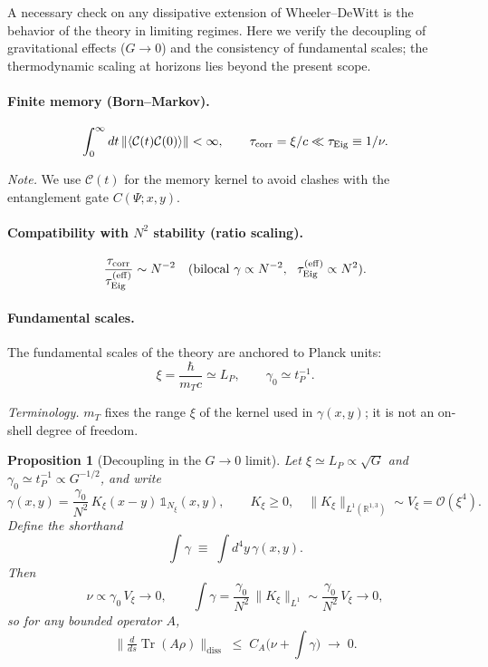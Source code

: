 \documentclass[12pt,a4paper]{article}
\newtheorem{proposition}{Proposition}[section]
\renewcommand{\Tr}{\operatorname{Tr}}
\numberwithin{equation}{section}
\begin{document}
\vspace{0.3cm}
A necessary check on any dissipative extension of Wheeler--DeWitt is the behavior of the theory in limiting regimes. Here we verify the decoupling of gravitational effects ($G\to 0$) and the consistency of fundamental scales; the thermodynamic scaling at horizons lies beyond the present scope.

\paragraph{Finite memory (Born--Markov).}
\begin{equation}
\int_0^\infty dt\,\|\langle \mathcal{C}(t)\mathcal{C}(0)\rangle\| < \infty,
\qquad 
\tau_{\mathrm{corr}}=\xi/c \ll \tau_{\rm Eig}\equiv 1/\nu. 
\label{eq:finite-memory}
\end{equation}

\noindent\emph{Note.} We use $\mathcal{C}(t)$ for the memory kernel to avoid
clashes with the entanglement gate $C(\Psi;x,y)$.

\paragraph{Compatibility with $N^2$ stability (ratio scaling).}
\begin{equation}
\frac{\tau_{\mathrm{corr}}}{\tau_{\rm Eig}^{(\mathrm{eff})}} \sim N^{-2}
\quad\text{(bilocal }\gamma\propto N^{-2},\ \
\tau_{\rm Eig}^{(\mathrm{eff})}\propto N^2\text{).} 
\label{eq:ratio-scaling}
\end{equation}

\paragraph{Fundamental scales.}
The fundamental scales of the theory are anchored to Planck units:
\begin{equation}
\xi = \frac{\hbar}{m_T c} \simeq L_P, \qquad
\gamma_0 \simeq t_P^{-1}.
\label{eq:fundamental-scales}
\end{equation}

\noindent\textit{Terminology.} $m_T$ fixes the range $\xi$ of the kernel used
in $\gamma(x,y)$; it is not an on-shell degree of freedom.

\begin{proposition}[Decoupling in the $G\!\to\!0$ limit]
\label{prop:Gto0}
Let $\xi\simeq L_P\propto\sqrt{G}$ and
$\gamma_0\simeq t_P^{-1}\propto G^{-1/2}$, and write
\[
\gamma(x,y)=\frac{\gamma_0}{N^2}\,K_\xi(x-y)\,
\mathbb{1}_{N_\xi}(x,y),\qquad
K_\xi\ge0,\quad \|K_\xi\|_{L^1(\mathbb{R}^{1,3})}\sim V_\xi=\mathcal O(\xi^4) .
\]
Define the shorthand
\[
\int\!\gamma \;\equiv\; \int d^4y\,\gamma(x,y).
\]
Then
\[
\nu\propto \gamma_0\,V_\xi \to 0,\qquad
\int\!\gamma=\frac{\gamma_0}{N^2}\,\|K_\xi\|_{L^1}
\sim \frac{\gamma_0}{N^2}\,V_\xi \to 0,
\]
so for any bounded operator $A$,
\[
\Big\|\tfrac{d}{ds}\Tr(A\rho)\Big\|_{\mathrm{diss}}
\;\le\; C_A\big(\nu+\!\int\!\gamma\big)\;\to\;0.
\]
\end{proposition}
\end{document}
